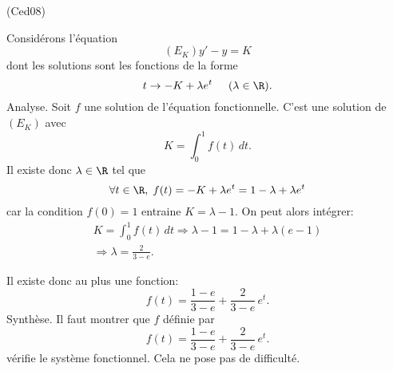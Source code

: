 \begin{tiny}(Ced08)\end{tiny} Considérons l'équation 
\[
  (E_K) y' - y = K
\]
dont les solutions sont les fonctions de la forme
\[
  t \rightarrow -K + \lambda e^t  \hspace{0.5cm}(\lambda \in \R).
\]
Analyse. Soit $f$ une solution de l'équation fonctionnelle. C'est une solution de $(E_K)$ avec 
\[
  K = \int_0^1f(t)\,dt.
\]
Il existe donc $\lambda \in \R$ tel que 
\[
  \forall t \in \R, \; f(t) = -K + \lambda e^t = 1 - \lambda + \lambda e^t
\]
car la condition $f(0)=1$ entraine $K= \lambda - 1$. On peut alors intégrer:
\begin{multline*}
  K = \int_0^1f(t)\,dt 
  \Rightarrow 
  \lambda - 1 = 1- \lambda + \lambda(e-1)\\
  \Rightarrow 
  \lambda = \frac{2}{3-e}.
\end{multline*}

Il existe donc au plus une fonction:
\[
  f(t) = \frac{1-e}{3-e}+ \frac{2}{3-e}\,e^t.
\]
Synthèse. Il faut montrer que $f$ définie par
\[
  f(t) = \frac{1-e}{3-e}+ \frac{2}{3-e}\,e^t.
\]
vérifie le système fonctionnel. Cela ne pose pas de difficulté.
